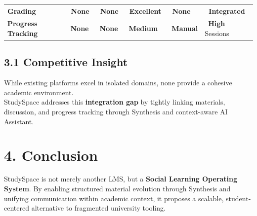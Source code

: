 \documentclass[11pt, a4paper]{article}
\newcommand{\statGreen}[1]{\raisebox{-0.45ex}{\textcolor{statusGreen}{\huge$\bullet$}}\ \textbf{#1}}
\newcommand{\statYellow}[1]{\raisebox{-0.45ex}{\textcolor{statusYellow}{\huge$\bullet$}}\ \textbf{#1}}
\newcommand{\statRed}[1]{\raisebox{-0.45ex}{\textcolor{statusRed}{\huge$\bullet$}}\ \textbf{#1}}
\begin{document}
\begin{table}[h]
\begin{tabularx}{\textwidth}{|p{3.2cm}|X|X|X|X|X|}
    \textbf{Grading} &
    \statRed{None} &
    \statRed{None} &
    \statGreen{Excellent} &
    \statRed{None} &
    \statYellow{Integrated} \newline  \\ \hline

    \textbf{Progress Tracking} &
    \statRed{None} &
    \statRed{None} &
    \statYellow{Medium} &
    \statYellow{Manual} &
    \statGreen{High}  \newline Sessions \\ \hline
    \end{tabularx}
\end{table}

\subsection{3.1 Competitive Insight}
While existing platforms excel in isolated domains, none provide a cohesive academic environment. \\ StudySpace addresses this \textbf{integration gap} by tightly linking materials, discussion, and progress tracking through Synthesis and context-aware AI Assistant.

\section{4. Conclusion}
StudySpace is not merely another LMS, but a \textbf{Social Learning Operating System}. By enabling structured material evolution through Synthesis and unifying communication within academic context, it proposes a scalable, student-centered alternative to fragmented university tooling.
\end{document}
